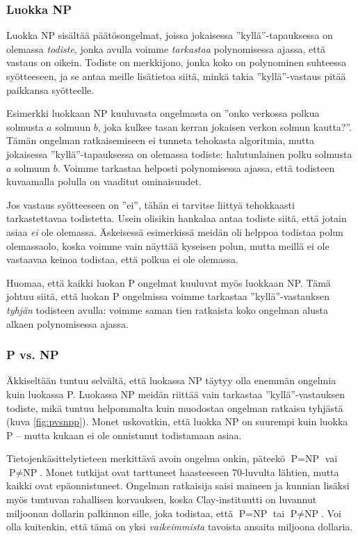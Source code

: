 \subsubsection{Luokka NP}

Luokka NP sisältää päätösongelmat, joissa jokaisessa
''kyllä''-tapauksessa on olemassa
\emph{todiste}, jonka avulla voimme
\emph{tarkastaa} polynomisessa ajassa, että vastaus on oikein.
Todiste on merkkijono, jonka koko on polynominen
suhteessa syötteeseen,
ja se antaa meille lisätietoa siitä,
minkä takia ''kyllä''-vastaus pitää paikkansa syötteelle.

Esimerkki luokkaan NP kuuluvasta ongelmasta on
''onko verkossa polkua solmusta $a$ solmuun $b$,
joka kulkee tasan kerran jokaisen verkon solmun kautta?''.
Tämän ongelman ratkaisemiseen ei tunneta tehokasta algoritmia,
mutta jokaisessa ''kyllä''-tapauksessa on olemassa todiste:
halutunlainen polku solmusta $a$ solmuun $b$.
Voimme tarkastaa helposti polynomisessa ajassa,
että todisteen kuvaamalla polulla on vaaditut ominaisuudet.

Jos vastaus syötteeseen on ''ei'', tähän ei tarvitse
liittyä tehokkaasti tarkastettavaa todistetta.
Usein olisikin hankalaa antaa todiste siitä, että jotain
asiaa \emph{ei} ole olemassa.
Äskeisessä esimerkissä meidän oli helppoa todistaa
polun olemassaolo, koska voimme vain näyttää kyseisen polun,
mutta meillä ei ole vastaavaa keinoa todistaa, että polkua ei ole olemassa.

Huomaa, että kaikki luokan P ongelmat kuuluvat myös
luokkaan NP. Tämä johtuu siitä, että luokan P ongelmissa
voimme tarkastaa ''kyllä''-vastauksen
\emph{tyhjän} todisteen avulla: voimme saman tien ratkaista
koko ongelman alusta alkaen polynomisessa ajassa.

\subsubsection{P vs. NP}

Äkkiseltään tuntuu selvältä, että luokassa NP täytyy olla
enemmän ongelmia kuin luokassa P.
Luokassa NP meidän riittää vain tarkastaa ''kyllä''-vastauksen
todiste, mikä tuntuu helpommalta kuin muodostaa ongelman ratkaisu tyhjästä (kuva \ref{fig:pvsnpp}).
Monet uskovatkin, että luokka NP on suurempi kuin luokka P --
mutta kukaan ei ole onnistunut todistamaan asiaa.

Tietojenkäsittelytieteen merkittävä avoin ongelma onkin,
päteekö $\textrm{P}=\textrm{NP}$ vai $\textrm{P} \neq \textrm{NP}$.
Monet tutkijat ovat tarttuneet haasteeseen
70-luvulta lähtien, mutta kaikki ovat epäonnistuneet.
Ongelman ratkaisija saisi maineen ja kunnian lisäksi
myös tuntuvan rahallisen korvauksen, koska
Clay-instituutti on luvannut miljoonan dollarin palkinnon
sille, joka todistaa, että $\textrm{P}=\textrm{NP}$ tai $\textrm{P} \neq \textrm{NP}$.
Voi olla kuitenkin, että tämä on yksi \emph{vaikeimmista}
tavoista ansaita miljoona dollaria.

